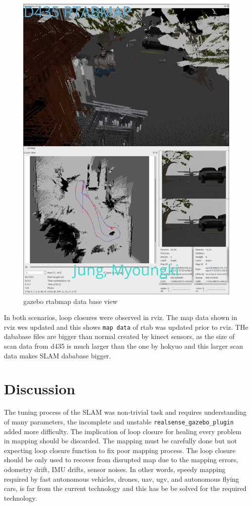 \documentclass[10pt,journal,compsoc]{IEEEtran}
\begin{document}
\begin{figure}[thpb]
      \centering
      \includegraphics[width=\linewidth]{./img/gazebo_rtabmapdbview.png}
      \caption{gazebo rtabmap data base view}
      \label{fig:gazebo_rtabmapdbview}
\end{figure}

In both scenarios, loop closures were observed in rviz. The map data shown in rviz wes updated and this shows \verb!map data! of rtab was updated prior to rviz.
THe dababase files are bigger than normal created by kinect sensors, as the size of scan data from d435 is much larger than the one by hokyuo and this larger scan data makes SLAM dababase bigger.
\section{Discussion}
 
The tuning process of the SLAM was non-trivial task and requires understanding of many parameters, the incomplete and unstable \verb!realsense_gazebo_plugin! added more difficulty. The implication of loop closure for healing every problem in mapping should be discarded. The mapping must be carefully done but not expecting loop closure function to fix poor mapping process. The loop closure should be only used to recover from disrupted map due to the mapping errors, odometry drift, IMU drifts, sensor noises. In other words, speedy mapping required by fast autonomous vehicles, drones, uav, ugv, and autonomous flying cars, is far from the current technology and this has be be solved for the required technology.
\end{document}

